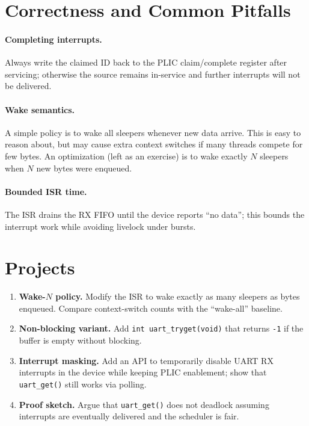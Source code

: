 

\section{Correctness and Common Pitfalls}

\paragraph{Completing interrupts.}
Always write the claimed ID back to the PLIC claim/complete register after servicing; otherwise the
source remains in-service and further interrupts will not be delivered.

\paragraph{Wake semantics.}
A simple policy is to wake all sleepers whenever new data arrive. This is easy to reason about, but
may cause extra context switches if many threads compete for few bytes. An optimization (left as an
exercise) is to wake exactly $N$ sleepers when $N$ new bytes were enqueued.

\paragraph{Bounded ISR time.}
The ISR drains the RX FIFO until the device reports “no data”; this bounds the interrupt work while
avoiding livelock under bursts.

\section*{Projects}

\begin{enumerate}
  \item \textbf{Wake-$N$ policy.} Modify the ISR to wake exactly as many sleepers as bytes enqueued.
        Compare context-switch counts with the “wake-all” baseline.
  \item \textbf{Non-blocking variant.} Add \texttt{int uart\_tryget(void)} that returns \texttt{-1}
        if the buffer is empty without blocking.
  \item \textbf{Interrupt masking.} Add an API to temporarily disable UART RX interrupts in the
        device while keeping PLIC enablement; show that \texttt{uart\_get()} still works via polling.
  \item \textbf{Proof sketch.} Argue that \texttt{uart\_get()} does not deadlock assuming interrupts
        are eventually delivered and the scheduler is fair.
\end{enumerate}

